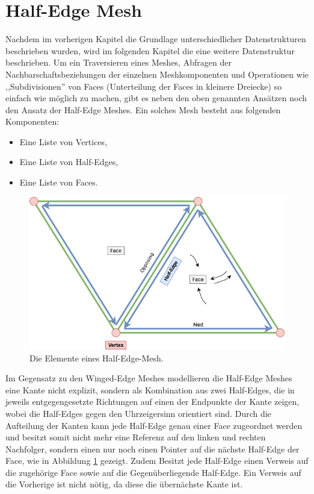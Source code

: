 \section{Half-Edge Mesh}
Nachdem im vorherigen Kapitel die Grundlage unterschiedlicher Datenstrukturen beschrieben wurden, wird im folgenden Kapitel die eine weitere Datenstruktur beschrieben. Um ein Traversieren eines Meshes, Abfragen der Nachbarschaftsbeziehungen der einzelnen Meshkomponenten und Operationen wie ,,Subdivisionen'' von Faces (Unterteilung der Faces in kleinere Dreiecke) so einfach wie m\"oglich zu machen, gibt es neben den oben genannten Ans\"atzen noch den Ansatz der Half-Edge Meshes. Ein solches Mesh besteht aus folgenden Komponenten:
\begin{itemize}
	\item Eine Liste von Vertices,
	\item Eine Liste von Half-Edges,
	\item Eine Liste von Faces.
\end{itemize}

\begin{figure}[h]
	\centering
	\includegraphics[width=0.7\linewidth]{Images/half-edge-mesh}
	\caption[Half-Edge-Mesh Schematik]{Die Elemente eines Half-Edge-Mesh.}
	\label{fig:half-edge-mesh}
\end{figure}

Im Gegensatz zu den Winged-Edge Meshes modellieren die Half-Edge Meshes eine Kante nicht explizit, sondern als Kombination aus zwei Half-Edges, die in jeweils entgegengesetzte Richtungen auf einen der Endpunkte der Kante zeigen, wobei die Half-Edges gegen den Uhrzeigersinn orientiert sind. Durch die Aufteilung der Kanten kann jede Half-Edge genau einer Face zugeordnet werden und besitzt somit nicht mehr eine Referenz auf den linken und rechten Nachfolger, sondern einen nur noch einen Pointer auf die n\"achste Half-Edge der Face, wie in Abbildung \ref{fig:half-edge-mesh} gezeigt. Zudem Besitzt jede Half-Edge einen Verweis auf die zugeh\"orige Face sowie auf die Gegen\"uberliegende Half-Edge. Ein Verweis auf die Vorherige ist nicht n\"otig, da diese die \"ubern\"achste Kante ist. 

